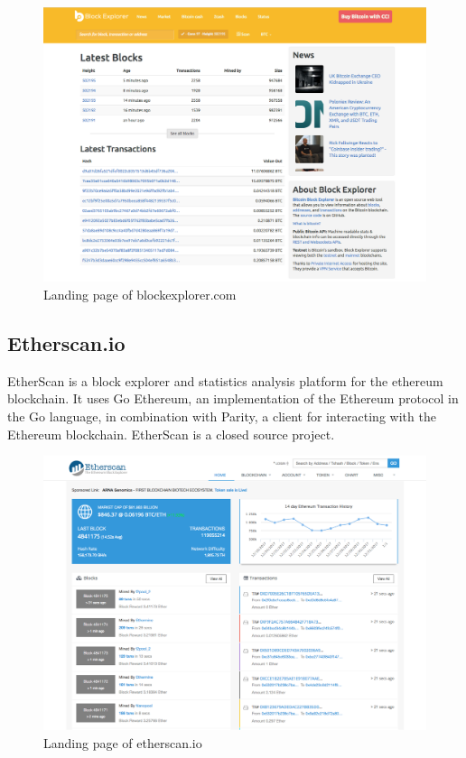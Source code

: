 \begin{figure}
  \includegraphics[width=\linewidth]{blockexplorer.png}
  \caption{Landing page of blockexplorer.com}
  \label{fig:blockexplorer1}
\end{figure}

\subsection{Etherscan.io}
EtherScan is a block explorer and statistics analysis platform for the ethereum blockchain. It uses Go Ethereum, an implementation of the Ethereum protocol in the Go language, in combination with Parity, a client for interacting with the Ethereum blockchain. EtherScan is a closed source project.

\begin{figure}
  \includegraphics[width=\linewidth]{etherscan.png}
  \caption{Landing page of etherscan.io}
  \label{fig:etherscan1}
\end{figure}

